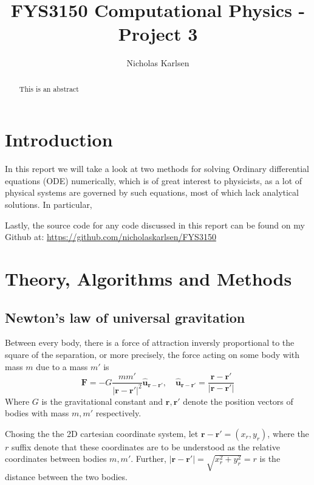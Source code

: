 \documentclass[10pt,showpacs,preprintnumbers,footinbib,amsmath,amssymb,aps,prl,twocolumn,groupedaddress,superscriptaddress,showkeys]{revtex4-1}
\begin{document}
\title{FYS3150 Computational Physics - Project 3}
\author{Nicholas Karlsen}

\begin{abstract}
This is an abstract
\end{abstract}

\maketitle

\section{Introduction}

  In this report we will take a look at two methods for solving Ordinary differential equations (ODE) numerically, which is of great interest to physicists, as a lot of physical systems are governed by such equations, most of which lack analytical solutions. In particular, 
  
  Lastly, the source code for any code discussed in this report can be found on my
  Github at: \url{https://github.com/nicholaskarlsen/FYS3150}

\section{Theory, Algorithms and Methods}
  
  \subsection{Newton's law of universal gravitation}
    Between every body, there is a force of attraction inversly proportional to the square of the separation, or more precisely, the force acting on some body with mass $m$ due to a mass $m'$ is
    \begin{equation}
      \mathbf F = -G\frac{m m'}{|\mathbf r - \mathbf r'|^2}\mathbf{\hat{u}_{r-r'}}, \quad \mathbf{\hat{u}_{r-r'}} = \frac{\mathbf r - \mathbf r'}{\mathbf |\mathbf r - \mathbf r'|}
    \end{equation}
    Where $G$ is the gravitational constant and $\mathbf r, \mathbf r'$ denote the position vectors of bodies with mass $m, m'$ respectively.

    Chosing the the 2D cartesian coordinate system, let $\mathbf r - \mathbf r'= (x_{r}, y_{r})$, where the $r$ suffix denote that these coordinates are to be understood as the relative coordinates between bodies $m, m'$.
    Further, $|\mathbf r - \mathbf r'| = \sqrt{x_r^2 + y_r^2} = r$ is the distance between the two bodies.
\end{document}
